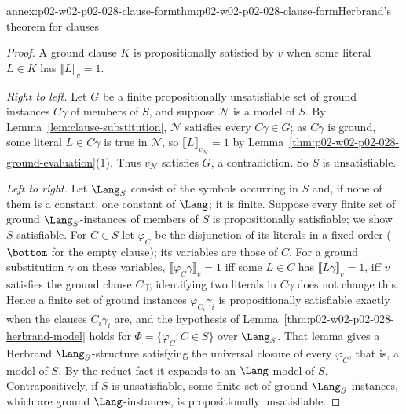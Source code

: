 \begin{annexitem}{annex:p02-w02-p02-028-clause-form}{thm:p02-w02-p02-028-clause-form}{Herbrand's theorem for clauses}
\begin{proof}
A ground clause \(K\) is propositionally satisfied by \(v\) when some literal
\(L\in K\) has \(\llbracket L\rrbracket_v=1\).

\emph{Right to left.}  Let \(G\) be a finite propositionally unsatisfiable
set of ground instances \(C\gamma\) of members of \(S\), and suppose
\(\mathcal N\) is a model of \(S\).  By Lemma~\ref{lem:clause-substitution},
\(\mathcal N\) satisfies every \(C\gamma\in G\); as \(C\gamma\) is ground,
some literal \(L\in C\gamma\) is true in \(\mathcal N\), so
\(\llbracket L\rrbracket_{v_{\mathcal N}}=1\) by
Lemma~\ref{thm:p02-w02-p02-028-ground-evaluation}(1).  Thus
\(v_{\mathcal N}\) satisfies \(G\), a contradiction.  So \(S\) is
unsatisfiable.

\emph{Left to right.}  Let \(\Lang_S\) consist of the symbols occurring in
\(S\) and, if none of them is a constant, one constant of \(\Lang\); it is
finite.  Suppose every finite set of ground \(\Lang_S\)-instances of members
of \(S\) is propositionally satisfiable; we show \(S\) satisfiable.  For
\(C\in S\) let \(\varphi_C\) be the disjunction of its literals in a fixed
order (\(\bottom\) for the empty clause); its variables are those of \(C\).
For a ground substitution \(\gamma\) on these variables,
\(\llbracket\varphi_C\gamma\rrbracket_v=1\) iff some \(L\in C\) has
\(\llbracket L\gamma\rrbracket_v=1\), iff \(v\) satisfies the ground clause
\(C\gamma\); identifying two literals in \(C\gamma\) does not change this.
Hence a finite set of ground instances \(\varphi_{C_i}\gamma_i\) is
propositionally satisfiable exactly when the clauses \(C_i\gamma_i\) are, and
the hypothesis of Lemma~\ref{thm:p02-w02-p02-028-herbrand-model} holds for
\(\Phi=\{\varphi_C:C\in S\}\) over \(\Lang_S\).  That lemma gives a Herbrand
\(\Lang_S\)-structure satisfying the universal closure of every
\(\varphi_C\), that is, a model of \(S\).  By the reduct fact it expands to an
\(\Lang\)-model of \(S\).  Contrapositively, if \(S\) is unsatisfiable, some
finite set of ground \(\Lang_S\)-instances, which are ground
\(\Lang\)-instances, is propositionally unsatisfiable.
\end{proof}
\end{annexitem}

